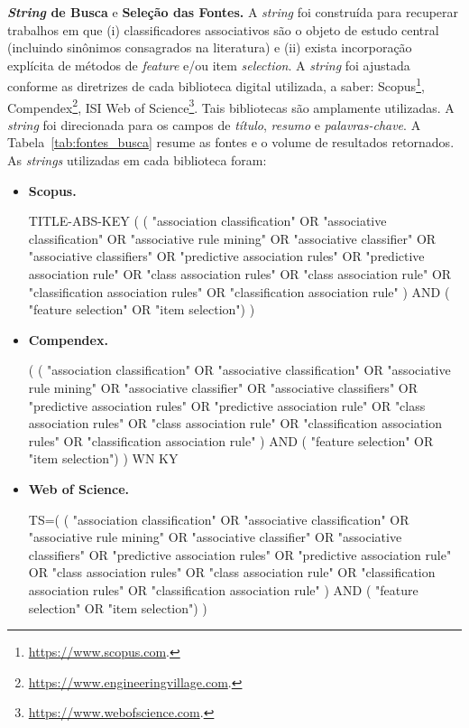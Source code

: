 \textbf{\textit{String} de Busca} e \textbf{Seleção das Fontes.} A \textit{string} foi construída para recuperar trabalhos em que (i) classificadores associativos são o
objeto de estudo central (incluindo sinônimos consagrados na literatura) e (ii) exista incorporação explícita de métodos de \textit{feature} e/ou item \textit{selection}. A \textit{string} foi ajustada conforme as diretrizes de cada biblioteca digital utilizada, a saber: Scopus\footnote{\url{https://www.scopus.com}.}, Compendex\footnote{\url{https://www.engineeringvillage.com}.}, ISI Web of Science\footnote{\url{https://www.webofscience.com}.}. Tais bibliotecas são amplamente utilizadas. A \textit{string} foi direcionada para os campos de \textit{título},
\textit{resumo} e \textit{palavras-chave}. A Tabela~\ref{tab:fontes_busca}
resume as fontes e o volume de resultados retornados. As \textit{strings} utilizadas em cada biblioteca foram:

\begin{itemize}
    \item \textbf{Scopus.} {\ttfamily\raggedright TITLE-ABS-KEY ( ( "association classification" OR "associative classification" OR
    "associative rule mining" OR "associative classifier" OR "associative classifiers" OR
    "predictive association rules" OR "predictive association rule" OR
    "class association rules" OR "class association rule" OR
    "classification association rules" OR "classification association rule" )
    AND ( "feature selection" OR "item selection") ) \par}

    \item \textbf{Compendex.} {\ttfamily\raggedright ( ( "association classification" OR "associative classification" OR "associative rule mining" OR
    "associative classifier" OR "associative classifiers" OR "predictive association rules" OR
    "predictive association rule" OR "class association rules" OR "class association rule" OR
    "classification association rules" OR "classification association rule" )
    AND ( "feature selection" OR "item selection") ) WN KY \par}

    \item \textbf{Web of Science.} {\ttfamily\raggedright TS=( ( "association classification" OR "associative classification" OR "associative rule mining" OR
    "associative classifier" OR "associative classifiers" OR "predictive association rules" OR
    "predictive association rule" OR "class association rules" OR "class association rule" OR
    "classification association rules" OR "classification association rule" )
    AND ( "feature selection" OR "item selection") ) \par}
\end{itemize}

